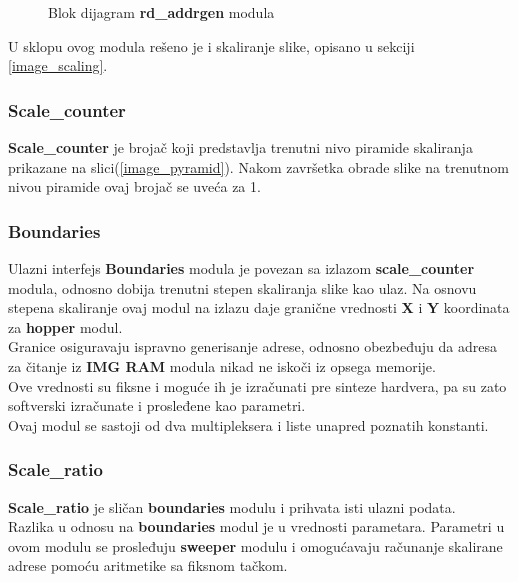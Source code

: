 \begin{figure}[H]
    
\caption{Blok dijagram \textbf{rd\_addrgen} modula}
\label{rd_addrgen_bd}
\end{figure}

U sklopu ovog modula rešeno je i skaliranje slike, opisano u sekciji \ref{image_scaling}.

\subsubsection{Scale\_counter}\label{scale_counter_sec}
\textbf{Scale\_counter} je brojač koji predstavlja trenutni nivo piramide
skaliranja prikazane na slici(\ref{image_pyramid}).
Nakom završetka obrade slike na trenutnom nivou piramide ovaj brojač se uveća za
1. \\

\subsubsection{Boundaries}\label{boundaries_sec}
Ulazni interfejs \textbf{Boundaries} modula je povezan sa izlazom
\textbf{scale\_counter} modula, odnosno dobija trenutni stepen skaliranja slike kao ulaz.
Na osnovu stepena skaliranje ovaj modul na izlazu daje granične vrednosti
\textbf{X} i \textbf{Y} koordinata za \textbf{hopper} modul.\\
Granice osiguravaju ispravno generisanje adrese, odnosno obezbeđuju da
adresa za čitanje iz \textbf{IMG RAM} modula nikad ne iskoči iz opsega memorije. \\
Ove vrednosti su fiksne i moguće ih je izračunati pre sinteze hardvera, pa su
zato softverski izračunate i prosleđene kao parametri. \\
Ovaj modul se sastoji od dva multipleksera i liste unapred poznatih konstanti. \\

\subsubsection{Scale\_ratio}\label{scale_ratio_sec}

\textbf{Scale\_ratio} je sličan \textbf{boundaries} modulu i prihvata isti
ulazni podata. \\
Razlika u odnosu na \textbf{boundaries} modul je u vrednosti parametara.
Parametri u ovom modulu se prosleđuju \textbf{sweeper} modulu i omogućavaju
računanje skalirane adrese pomoću aritmetike sa fiksnom tačkom. \\

